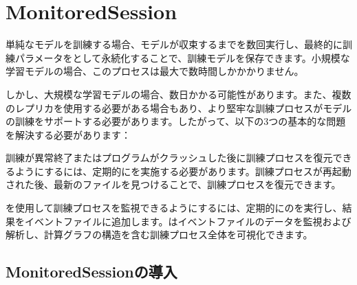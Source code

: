 \begin{savequote}[45mm]
\end{savequote}

\chapter{MonitoredSession} 
\label{ch:monitored-session}

\begin{content}

単純なモデルを訓練する場合、モデルが収束するまでを数回実行し、最終的に訓練パラメータをとして永続化することで、訓練モデルを保存できます。小規模な学習モデルの場合、このプロセスは最大で数時間しかかかりません。

しかし、大規模な学習モデルの場合、数日かかる可能性があります。また、複数のレプリカを使用する必要がある場合もあり、より堅牢な訓練プロセスがモデルの訓練をサポートする必要があります。したがって、以下の3つの基本的な問題を解決する必要があります：

\begin{enum}
\end{enum}

訓練が異常終了またはプログラムがクラッシュした後に訓練プロセスを復元できるようにするには、定期的にを実施する必要があります。訓練プロセスが再起動された後、最新のファイルを見つけることで、訓練プロセスを復元できます。

を使用して訓練プロセスを監視できるようにするには、定期的にのを実行し、結果をイベントファイルに追加します。はイベントファイルのデータを監視および解析し、計算グラフの構造を含む訓練プロセス全体を可視化できます。

\end{content}

\section{MonitoredSessionの導入}

